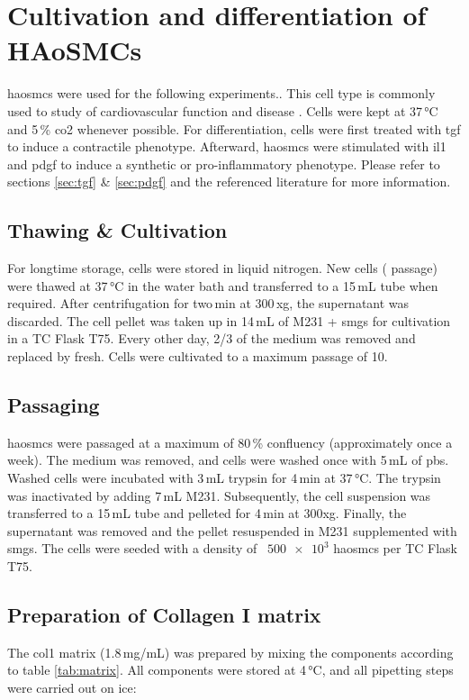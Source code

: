 \section{Cultivation and differentiation of HAoSMCs}
\label{sec:cultivation}
\Acp{haosmc} were used for the following experiments.. This cell type is commonly used to study of cardiovascular function and disease \cite{[Reference for this claim]}. Cells were kept at 37\,°C and 5\,\% \ac{co2} whenever possible. For differentiation, cells were first treated with \ac{tgf} to induce a contractile phenotype. Afterward, \acp{haosmc} were stimulated with \acf{il1} and \ac{pdgf} to induce a synthetic or pro-inflammatory phenotype. Please refer to sections \ref{sec:tgf} \& \ref{sec:pdgf} and the referenced literature for more information.

    \subsection{Thawing \& Cultivation}
    For longtime storage, cells were stored in liquid nitrogen. New cells ( passage) were thawed at 37\,°C in the water bath and transferred to a 15\,mL tube when required. After centrifugation for two\,min at 300\,xg, the supernatant was discarded. The cell pellet was taken up in 14\,mL of \ac{M231} + \ac{smgs} for cultivation in a TC Flask T75. Every other day, 2/3 of the medium was removed and replaced by fresh. Cells were cultivated to a maximum passage of 10.

    \subsection{Passaging}
    \acp{haosmc} were passaged at a maximum of 80\,\% confluency (approximately once a week). The medium was removed, and cells were washed once with 5\,mL of \ac{pbs}. Washed cells were incubated with 3\,mL trypsin for 4\,min at 37\,°C. The trypsin was inactivated by adding 7\,mL \ac{M231}. Subsequently, the cell suspension was transferred to a 15\,mL tube and pelleted for 4\,min at 300xg. Finally, the supernatant was removed and the pellet resuspended in \ac{M231} supplemented with \ac{smgs}. The cells were seeded with a density of ~$\num{500e3}$ \acp{haosmc} per TC Flask T75.

    \subsection{Preparation of Collagen I matrix}
    \label{subsec:matrix}
    The \ac{col1} matrix (1.8\,mg/mL) was prepared by mixing the components according to table \ref{tab:matrix}. All components were stored at 4\,°C, and all pipetting steps were carried out on ice:

